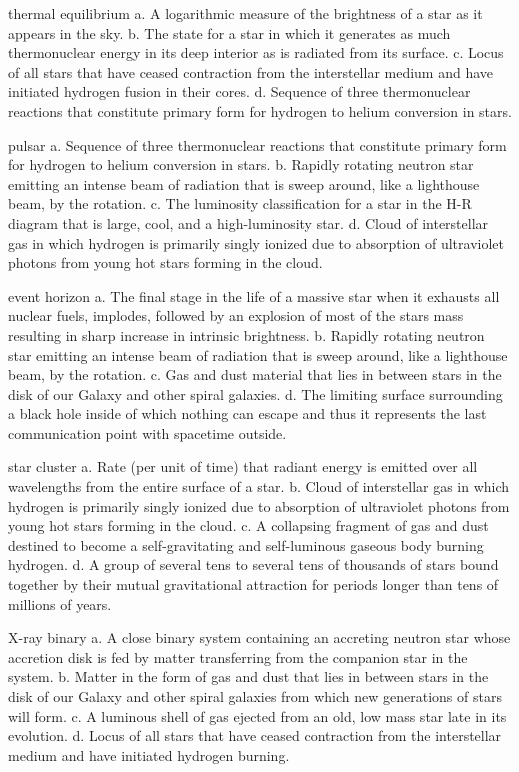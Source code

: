     thermal equilibrium
    a. A logarithmic measure of the brightness of a star as it appears in the sky.
    b. The state for a star in which it generates as much thermonuclear energy in its deep interior as is radiated from its surface.
    c. Locus of all stars that have ceased contraction from the interstellar medium and have initiated hydrogen fusion in their cores.
    d. Sequence of three thermonuclear reactions that constitute primary form for hydrogen to helium conversion in stars.

    pulsar
    a. Sequence of three thermonuclear reactions that constitute primary form for hydrogen to helium conversion in stars.
    b. Rapidly rotating neutron star emitting an intense beam of radiation that is sweep around, like a lighthouse beam, by the rotation.
    c. The luminosity classification for a star in the H-R diagram that is large, cool, and a high-luminosity star.
    d. Cloud of interstellar gas in which hydrogen is primarily singly ionized due to absorption of ultraviolet photons from young hot stars forming in the cloud.

    event horizon
    a. The final stage in the life of a massive star when it exhausts all nuclear fuels, implodes, followed by an explosion of most of the stars mass resulting in sharp increase in intrinsic brightness.
    b. Rapidly rotating neutron star emitting an intense beam of radiation that is sweep around, like a lighthouse beam, by the rotation.
    c. Gas and dust material that lies in between stars in the disk of our Galaxy and other spiral galaxies.
    d. The limiting surface surrounding a black hole inside of which nothing can escape and thus it represents the last communication point with spacetime outside.

    star cluster
    a. Rate (per unit of time) that radiant energy is emitted over all wavelengths from the entire surface of a star.
    b. Cloud of interstellar gas in which hydrogen is primarily singly ionized due to absorption of ultraviolet photons from young hot stars forming in the cloud.
    c. A collapsing fragment of gas and dust destined to become a self-gravitating and self-luminous gaseous body burning hydrogen.
    d. A group of several tens to several tens of thousands of stars bound together by their mutual gravitational attraction for periods longer than tens of millions of years.

    X-ray binary
    a. A close binary system containing an accreting neutron star whose accretion disk is fed by matter transferring from the companion star in the system.
    b. Matter in the form of gas and dust that lies in between stars in the disk of our Galaxy and other spiral galaxies from which new generations of stars will form.
    c. A luminous shell of gas ejected from an old, low mass star late in its evolution.
    d. Locus of all stars that have ceased contraction from the interstellar medium and have initiated hydrogen burning.

